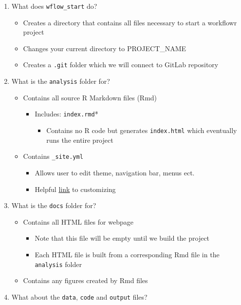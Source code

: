 \documentclass[openany]{article}
\providecommand{\tightlist}{%
  \setlength{\itemsep}{0pt}\setlength{\parskip}{0pt}}
\begin{document}
\begin{enumerate}
\def\labelenumi{\arabic{enumi}.}
\tightlist
\item
  What does \texttt{wflow\_start} do?

  \begin{itemize}
  \tightlist
  \item
    Creates a directory that contains all files necessary to start a workflowr project
  \item
    Changes your current directory to PROJECT\_NAME
  \item
    Creates a \texttt{.git} folder which we will connect to GitLab repository
  \end{itemize}
\item
  What is the \texttt{analysis} folder for?

  \begin{itemize}
  \tightlist
  \item
    Contains all source R Markdown files (Rmd)

    \begin{itemize}
    \tightlist
    \item
      Includes: \texttt{index.rmd}*

      \begin{itemize}
      \tightlist
      \item
        Contains no R code but generates \texttt{index.html} which eventually runs the entire project
      \end{itemize}
    \end{itemize}
  \item
    Contains \texttt{\_site.yml}

    \begin{itemize}
    \tightlist
    \item
      Allows user to edit theme, navigation bar, menus ect.
    \item
      Helpful \href{https://bookdown.org/yihui/rmarkdown/rmarkdown-site.html}{link} to customizing
    \end{itemize}
  \end{itemize}
\item
  What is the \texttt{docs} folder for?

  \begin{itemize}
  \tightlist
  \item
    Contains all HTML files for webpage

    \begin{itemize}
    \tightlist
    \item
      Note that this file will be empty until we build the project
    \item
      Each HTML file is built from a corresponding Rmd file in the \texttt{analysis} folder
    \end{itemize}
  \item
    Contains any figures created by Rmd files
  \end{itemize}
\item
  What about the \texttt{data}, \texttt{code} and \texttt{output} files?


\end{enumerate}
\end{document}
